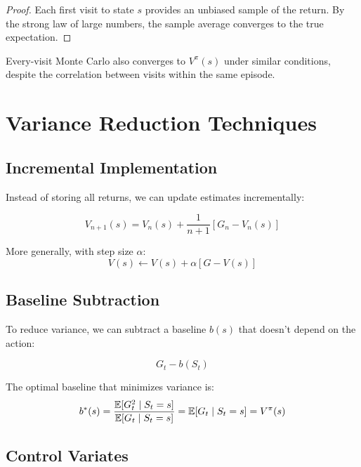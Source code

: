 \begin{proof}
Each first visit to state $s$ provides an unbiased sample of the return. By the strong law of large numbers, the sample average converges to the true expectation.
\end{proof}

\begin{theorem}
Every-visit Monte Carlo also converges to $V^\pi(s)$ under similar conditions, despite the correlation between visits within the same episode.
\end{theorem}

\section{Variance Reduction Techniques}

\subsection{Incremental Implementation}

Instead of storing all returns, we can update estimates incrementally:

\begin{equation}
V_{n+1}(s) = V_n(s) + \frac{1}{n+1}[G_n - V_n(s)]
\end{equation}

More generally, with step size $\alpha$:
\begin{equation}
V(s) \leftarrow V(s) + \alpha[G - V(s)]
\end{equation}

\subsection{Baseline Subtraction}

To reduce variance, we can subtract a baseline $b(s)$ that doesn't depend on the action:

\begin{equation}
G_t - b(S_t)
\end{equation}

The optimal baseline that minimizes variance is:
\begin{equation}
b^*(s) = \frac{\mathbb{E}[G_t^2 \mid S_t = s]}{\mathbb{E}[G_t \mid S_t = s]} = \mathbb{E}[G_t \mid S_t = s] = V^\pi(s)
\end{equation}

\subsection{Control Variates}

